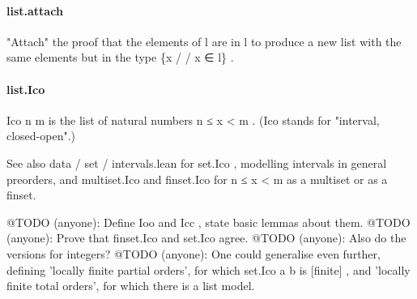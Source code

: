 \documentclass{article}
\begin{document}
\paragraph{list.attach}
\par
"Attach" the proof that the elements of 
\colorbox[RGB]{253,246,227}{{{{\color[RGB]{101, 123, 131} l }}}} are in 
\colorbox[RGB]{253,246,227}{{{{\color[RGB]{101, 123, 131} l }}}} to produce a new list
with the same elements but in the type 
\colorbox[RGB]{253,246,227}{{{{\color[RGB]{101, 123, 131} \{x  }}}{{{\color[RGB]{181, 137, 0} / }}}{{{\color[RGB]{181, 137, 0} / }}}{{{\color[RGB]{101, 123, 131}  x ∈ l\} }}}}.
\paragraph{list.Ico}
\par
\colorbox[RGB]{253,246,227}{{{{\color[RGB]{101, 123, 131} Ico n m }}}} is the list of natural numbers 
\colorbox[RGB]{253,246,227}{{{{\color[RGB]{101, 123, 131} n  }}}{{{\color[RGB]{181, 137, 0} ≤ }}}{{{\color[RGB]{101, 123, 131}  x  }}}{{{\color[RGB]{181, 137, 0} < }}}{{{\color[RGB]{101, 123, 131}  m }}}}.
(Ico stands for "interval, closed-open".)
\par
See also 
\colorbox[RGB]{253,246,227}{{{{\color[RGB]{101, 123, 131} data }}}{{{\color[RGB]{181, 137, 0} / }}}{{{\color[RGB]{101, 123, 131} set }}}{{{\color[RGB]{181, 137, 0} / }}}{{{\color[RGB]{101, 123, 131} intervals.lean }}}} for 
\colorbox[RGB]{253,246,227}{{{{\color[RGB]{101, 123, 131} set.Ico }}}}, modelling intervals in general preorders, and
\colorbox[RGB]{253,246,227}{{{{\color[RGB]{101, 123, 131} multiset.Ico }}}} and 
\colorbox[RGB]{253,246,227}{{{{\color[RGB]{101, 123, 131} finset.Ico }}}} for 
\colorbox[RGB]{253,246,227}{{{{\color[RGB]{101, 123, 131} n  }}}{{{\color[RGB]{181, 137, 0} ≤ }}}{{{\color[RGB]{101, 123, 131}  x  }}}{{{\color[RGB]{181, 137, 0} < }}}{{{\color[RGB]{101, 123, 131}  m }}}} as a multiset or as a finset.
\par
@TODO (anyone): Define 
\colorbox[RGB]{253,246,227}{{{{\color[RGB]{101, 123, 131} Ioo }}}} and 
\colorbox[RGB]{253,246,227}{{{{\color[RGB]{101, 123, 131} Icc }}}}, state basic lemmas about them.
@TODO (anyone): Prove that 
\colorbox[RGB]{253,246,227}{{{{\color[RGB]{101, 123, 131} finset.Ico }}}} and 
\colorbox[RGB]{253,246,227}{{{{\color[RGB]{101, 123, 131} set.Ico }}}} agree.
@TODO (anyone): Also do the versions for integers?
@TODO (anyone): One could generalise even further, defining
'locally finite partial orders', for which 
\colorbox[RGB]{253,246,227}{{{{\color[RGB]{101, 123, 131} set.Ico a b }}}} is 
\colorbox[RGB]{253,246,227}{{{{\color[RGB]{101, 123, 131} {[}finite{]} }}}}, and
'locally finite total orders', for which there is a list model.
\end{document}
